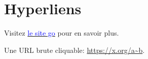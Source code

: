 \documentclass{article}
\begin{document}
\hsize=380pt
\section{Hyperliens}
Visitez \href{https://go.dev}{\textcolor{blue}{le site go}} pour en savoir plus.

Une URL brute cliquable: \url{https://x.org/a~b}.
\end{document}
